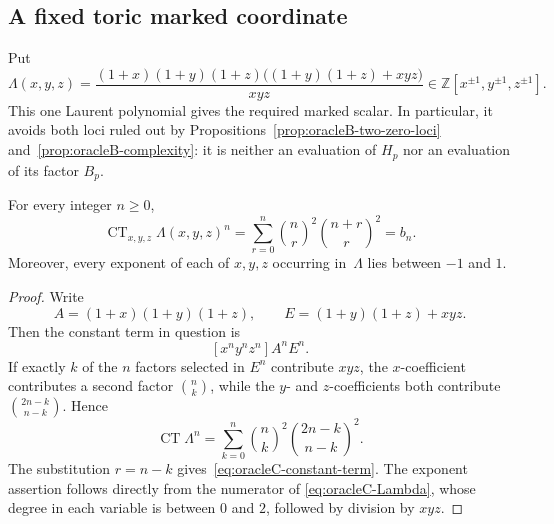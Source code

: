 
\subsection{A fixed toric marked coordinate}
\label{ssec:oracleC-result}

Put
\begin{equation}
 \Lambda(x,y,z)=
 \frac{(1+x)(1+y)(1+z)
  \bigl((1+y)(1+z)+xyz\bigr)}{xyz}
 \in\mathbb Z[x^{\pm1},y^{\pm1},z^{\pm1}].
 \label{eq:oracleC-Lambda}
\end{equation}
This one Laurent polynomial gives the required marked scalar.  In
particular, it avoids both loci ruled out by
Propositions~\ref{prop:oracleB-two-zero-loci}
and~\ref{prop:oracleB-complexity}: it is neither an evaluation of $H_p$
nor an evaluation of its factor $B_p$.

\begin{lemma}
\label{lem:oracleC-constant-term}
For every integer $n\geq0$,
\begin{equation}
 \operatorname {CT}_{x,y,z}\Lambda(x,y,z)^n
 =\sum_{r=0}^n\binom nr^2\binom{n+r}{r}^2=b_n.
 \label{eq:oracleC-constant-term}
\end{equation}
Moreover, every exponent of each of $x,y,z$ occurring in~$\Lambda$ lies
between $-1$ and $1$.
\end{lemma}

\begin{proof}
Write
\[
 A=(1+x)(1+y)(1+z),\qquad
 E=(1+y)(1+z)+xyz.
\]
Then the constant term in question is
\[
 [x^{n}y^{n}z^{n}]A^nE^n.
\]
If exactly $k$ of the $n$ factors selected in $E^n$ contribute $xyz$,
the $x$-coefficient contributes a second factor $\binom nk$, while the
$y$- and $z$-coefficients both contribute
$\binom{2n-k}{n-k}$.  Hence
\[
 \operatorname {CT}\Lambda^n
 =\sum_{k=0}^n\binom nk^2\binom{2n-k}{n-k}^2.
\]
The substitution $r=n-k$ gives~\eqref{eq:oracleC-constant-term}.
The exponent assertion follows directly from the numerator of
\eqref{eq:oracleC-Lambda}, whose degree in each variable is between $0$
and $2$, followed by division by $xyz$.
\end{proof}

